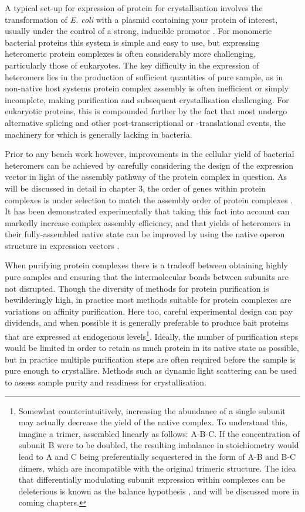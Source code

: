 \documentclass[a4paper,11pt,twoside,openright]{scrbook}
\begin{document}
A typical set-up for expression of protein for crystallisation involves the transformation of \textit{E. coli} with a plasmid containing your protein of interest, usually under the control of a strong, inducible promotor \cite{Rosano2014}. For monomeric bacterial proteins this system is simple and easy to use, but expressing heteromeric protein complexes is often considerably more challenging, particularly those of eukaryotes. The key difficulty in the expression of heteromers lies in the production of sufficient quantities of pure sample, as in non-native host systems protein complex assembly is often inefficient or simply incomplete, making purification and subsequent crystallisation challenging. For eukaryotic proteins, this is compounded further by the fact that most undergo alternative splicing and other post-transcriptional or -translational events, the machinery for which is generally lacking in bacteria.

Prior to any bench work however, improvements in the cellular yield of bacterial heteromers can be achieved by carefully considering the design of the expression vector in light of the assembly pathway of the protein complex in question. As will be discussed in detail in chapter 3, the order of genes within protein complexes is under selection to match the assembly order of protein complexes \cite{Wells2016}. It has been demonstrated experimentally that taking this fact into account can markedly increase complex assembly efficiency, and that yields of heteromers in their fully-assembled native state can be improved by using the native operon structure in expression vectors \cite{Shieh2015a, Poulsen2010}.

When purifying protein complexes there is a tradeoff between obtaining highly pure samples and ensuring that the intermolecular bonds between subunits are not disrupted. Though the diversity of methods for protein purification is bewilderingly high, in practice most methods suitable for protein complexes are variations on affinity purification. Here too, careful experimental design can pay dividends, and when possible it is generally preferable to produce bait proteins that are expressed at endogenous levels\footnote{Somewhat counterintuitively, increasing the abundance of a single subunit may actually decrease the yield of the native complex. To understand this, imagine a trimer, assembled linearly as follows: A-B-C. If the concentration of subunit B were to be doubled, the resulting imbalance in stoichiometry would lead to A and C being preferentially sequestered in the form of A-B and B-C dimers, which are incompatible with the original trimeric structure. The idea that differentially modulating subunit expression within complexes can be deleterious is known as the balance hypothesis \cite{Papp2003}, and will be discussed more in coming chapters.}. Ideally, the number of purification steps would be limited in order to retain as much protein in its native state as possible, but in practice multiple purification steps are often required before the sample is pure enough to crystallise. Methods such as dynamic light scattering \cite{Ni2013} can be used to assess sample purity and readiness for crystallisation.
\end{document}
